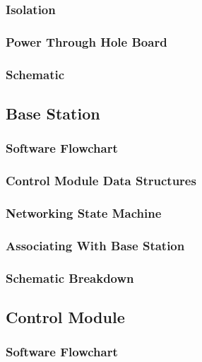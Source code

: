 \subsubsection{Isolation}

\subsubsection{Power Through Hole Board}

\subsubsection{Schematic}

\subsection{Base Station}

\subsubsection{Software Flowchart}

\subsubsection{Control Module Data Structures}

\subsubsection{Networking State Machine}

\subsubsection{Associating With Base Station}

\subsubsection{Schematic Breakdown}

\subsection{Control Module}

\subsubsection{Software Flowchart}

